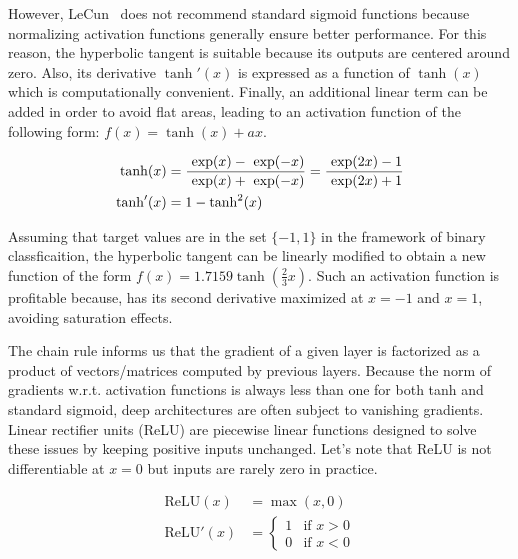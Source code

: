         However, LeCun~\cite{efficientBackprop} does not recommend standard sigmoid functions because normalizing
        activation functions generally ensure better performance.
        For this reason, the hyperbolic tangent is suitable because its outputs are centered around zero. 
        Also, its derivative $\tanh'(x)$ is expressed as a function of $\tanh(x)$ which is computationally convenient.
        Finally, an additional linear term can be added in order to
        avoid flat areas, leading to an activation function of the following form: $f(x) = \tanh(x) + ax$.

        \begin{equation}
            \begin{split}
                \tanh(x) & = \frac{\text{ exp}(x) - \text{ exp}(-x)}{\text{ exp}(x) + \text{ exp}(-x)} = \frac{\text{ exp}(2x) - 1}{\text{ exp}(2x) + 1} \\
                \tanh'(x) & = 1 - \tanh^2(x)
            \end{split}
        \end{equation}

        Assuming that target values are in the set $\{-1, 1\}$ in the framework of binary classficaition,
        the hyperbolic tangent can be linearly modified to obtain a new function of the form $f(x) = 1.7159 \tanh(\frac{2}{3} x)$.
        Such an activation function is profitable because, has its second derivative maximized at $x = -1$ and $x = 1$, avoiding
        saturation effects.

        The chain rule informs us that the gradient of a given layer is factorized as a product of vectors/matrices computed by previous layers.
        Because the norm of gradients w.r.t. activation functions is always less than one for both tanh and standard sigmoid,
        deep architectures are often subject to vanishing gradients. Linear rectifier units (ReLU) are piecewise linear functions designed to solve
        these issues by keeping positive inputs unchanged. Let's note that ReLU is not differentiable at $x = 0$ but inputs are rarely zero in practice.

        \begin{equation}
            \begin{split}
                \text{ReLU}(x) & = \max{(x, 0)} \\
                \text{ReLU}'(x) & = 
                \begin{cases}
                    1 & \text{if } x > 0 \\
                    0 & \text{if } x < 0
                \end{cases}
            \end{split}
        \end{equation}

